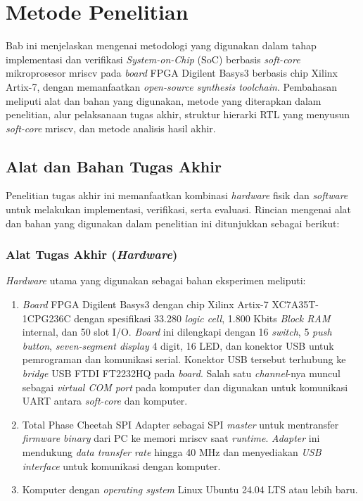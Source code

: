 \chapter{Metode Penelitian}

Bab ini menjelaskan mengenai metodologi yang digunakan dalam tahap implementasi dan verifikasi \textit{System-on-Chip} (SoC) berbasis \textit{soft-core} mikroprosesor mriscv pada \textit{board} FPGA Digilent Basys3 berbasis chip Xilinx Artix-7, dengan memanfaatkan \textit{open-source synthesis toolchain}. Pembahasan meliputi alat dan bahan yang digunakan, metode yang diterapkan dalam penelitian, alur pelaksanaan tugas akhir, struktur hierarki RTL yang menyusun \textit{soft-core} mriscv, dan metode analisis hasil akhir.


\section{Alat dan Bahan Tugas Akhir}
\label{sec:alat-bahan}

Penelitian tugas akhir ini memanfaatkan kombinasi \textit{hardware} fisik dan \textit{software} untuk melakukan implementasi, verifikasi, serta evaluasi. Rincian mengenai alat dan bahan yang digunakan dalam penelitian ini ditunjukkan sebagai berikut:



\subsection{Alat Tugas Akhir (\textit{Hardware})}
\label{subsec:alat-hardware}

\textit{Hardware} utama yang digunakan sebagai bahan eksperimen meliputi:

\begin{enumerate}
	\item \textit{Board} FPGA Digilent Basys3 dengan chip Xilinx Artix-7 XC7A35T-1CPG236C dengan spesifikasi 33.280 \textit{logic cell}, 1.800 Kbits \textit{Block RAM} internal, dan 50 slot I/O. \textit{Board} ini dilengkapi dengan 16 \textit{switch}, 5 \textit{push button}, \textit{seven-segment display} 4 digit, 16 LED, dan konektor USB untuk pemrograman dan komunikasi serial. Konektor USB tersebut terhubung ke \textit{bridge} USB FTDI FT2232HQ pada \textit{board}. Salah satu \textit{channel}-nya muncul sebagai \textit{virtual COM port} pada komputer dan digunakan untuk komunikasi UART antara \textit{soft-core} dan komputer.
	\item Total Phase Cheetah SPI Adapter sebagai SPI \textit{master} untuk mentransfer \textit{firmware binary} dari PC ke memori mriscv saat \textit{runtime}. \textit{Adapter} ini mendukung \textit{data transfer rate} hingga 40 MHz dan menyediakan \textit{USB interface} untuk komunikasi dengan komputer.
	\item Komputer dengan \textit{operating system} Linux Ubuntu 24.04 LTS atau lebih baru.
\end{enumerate}

